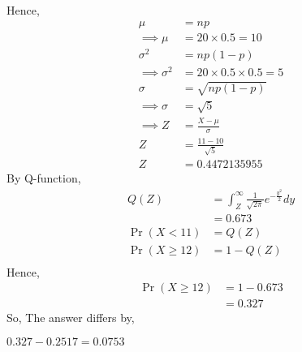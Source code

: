 \documentclass[journal,12pt,twocolumn]{IEEEtran}
\providecommand{\pr}[1]{\ensuremath{\Pr\left(#1\right)}}
\theoremstyle{remark}
\begin{document}
Hence,
\begin{align} 
	\mu &= np\\
	\implies
	\mu &= 20 \times 0.5 = 10\\
	\sigma^{2}&= np(1-p)\\
	\implies	
	\sigma^{2}&= 20 \times 0.5 \times 0.5 = 5\\
	\sigma&=\sqrt{np(1-p)}\\
	\implies
	\sigma&= \sqrt{5}\\
	\implies
	Z &= \frac{X-\mu}{\sigma}\\
	Z &= \frac{11-10}{\sqrt{5}}\\
	Z &= 0.4472135955
\end{align}
By Q-function,
\begin{align}
	Q(Z) &= \int_Z^{\infty} \frac{1}{\sqrt{2\pi}}e^{-\frac{y^2}{2}}dy\\
	&= 0.673\\
	\pr{X < 11} &= Q(Z)\\
	\pr{X \geq 12} &=1 - Q(Z)\\
\end{align}
Hence,
\begin{align}
	\pr{X \geq 12} &= 1 - 0.673\\
	&= 0.327
\end{align}
So, The answer differs by,

\(0.327 - 0.2517 = 0.0753\)
\end{document}
